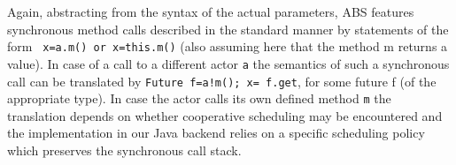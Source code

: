 Again, abstracting from the syntax of the actual parameters,
ABS features synchronous method calls described in the standard manner
by statements of the form \texttt{ x=a.m() or x=this.m()} (also assuming here that the method m returns a value). In case of a call to a different actor \texttt{a} the semantics of such a synchronous call can be translated
by \texttt{Future f=a!m(); x= f.get}, for some future f (of the appropriate type). In case the actor calls its own defined method \texttt{m} the translation depends on whether cooperative scheduling may be encountered and the implementation in our Java backend relies on a specific scheduling policy which preserves the synchronous call stack.










